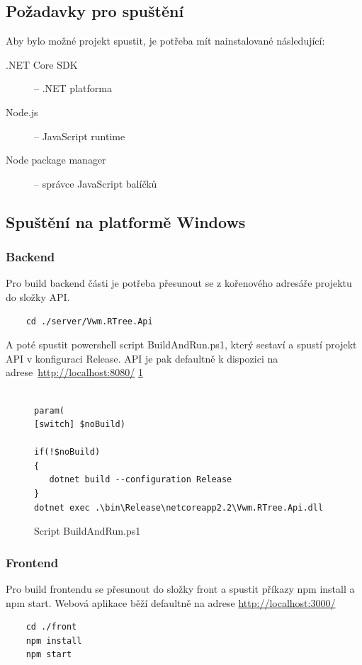 \documentclass[a4paper,10pt]{article}
\begin{document}
\subsection{Požadavky pro spuštění}
Aby bylo možné projekt spustit, je potřeba mít nainstalované následující:

\begin{description}
	\item[.NET Core SDK] -- .NET platforma \cite{dotnet}
    \item[Node.js] -- JavaScript runtime \cite{nodejs}
    \item[Node package manager] -- správce JavaScript balíčků \cite{npm}
\end{description}

\subsection{Spuštění na platformě Windows}
\subsubsection*{Backend}
Pro build backend části je potřeba přesunout se z kořenového adresáře projektu do složky API.

\begin{verbatim}
    cd ./server/Vwm.RTree.Api
\end{verbatim}
A poté spustit powershell script BuildAndRun.ps1, který sestaví a spustí projekt API v konfiguraci Release. API je pak defaultně k dispozici na adrese~\url{http://localhost:8080/} \ref{fig:buildandrun}
\begin{figure}
\label{fig:buildandrun}
\caption{Script BuildAndRun.ps1}
\begin{verbatim}

param(
[switch] $noBuild)

if(!$noBuild)
{
   dotnet build --configuration Release
}
dotnet exec .\bin\Release\netcoreapp2.2\Vwm.RTree.Api.dll
\end{verbatim}
\end{figure}

\subsubsection*{Frontend}
Pro build frontendu se přesunout do složky front a spustit příkazy npm install a npm start. Webová aplikace běží defaultně na adrese \url{http://localhost:3000/}
\begin{verbatim}
    cd ./front
    npm install
    npm start
\end{verbatim}
\end{document}
